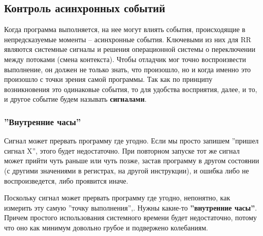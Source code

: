\subsection{Контроль асинхронных событий}



Когда программа выполняется, на нее могут влиять события, происходящие в
непредсказуемые моменты – асинхронные события. Ключевыми из них для RR являются
системные сигналы и решения операционной системы о переключении между потоками
(смена контекста). Чтобы отладчик мог точно воспроизвести выполнение, он должен
не только знать, что произошло, но и когда именно это произошло с точки зрения
самой программы. Так как по принципу возникновения это одинаковые события, то
для удобства восприятия, далее, и то, и другое событие будем называть
\textbf{сигналами}.

\subsubsection{''Внутренние часы''}

Сигнал может прервать программу где угодно. Если мы просто запишем ''пришел
сигнал X'', этого будет недостаточно. При повторном запуске тот же сигнал может
прийти чуть раньше или чуть позже, застав программу в другом состоянии (с
другими значениями в регистрах, на другой инструкции), и ошибка либо не
воспроизведется, либо проявится иначе.

Поскольку сигнал может
прервать программу где угодно, непонятно, как измерить эту самую ''точку
выполнения'',. Нужны какие-то \textbf{''внутренние часы''}. Причем простого использования
системного времени будет недостаточно, потому что оно как минимум довольно
грубое и подвержено колебаниям.


